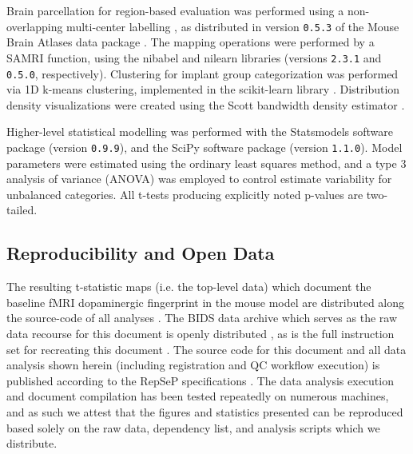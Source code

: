 Brain parcellation for region-based evaluation was performed using a non-overlapping multi-center labelling \cite{dsu1,dsu2,dsu3,dsu4}, as distributed in version \textcolor{mg}{\texttt{0.5.3}} of the Mouse Brain Atlases data package \cite{atlases_generator}.
The mapping operations were performed by a SAMRI function, using the nibabel \cite{nibabel} and nilearn \cite{nilearn} libraries (versions \textcolor{mg}{\texttt{2.3.1}} and \textcolor{mg}{\texttt{0.5.0}}, respectively).
Clustering for implant group categorization was performed via 1D k-means clustering, implemented in the scikit-learn library \cite{scikit-learn}.
Distribution density visualizations were created using the Scott bandwidth density estimator \cite{Scott1979}.

Higher-level statistical modelling was performed with the Statsmodels software package \cite{statsmodels} (version \textcolor{mg}{\texttt{0.9.9}}), and the SciPy software package \cite{scipy} (version \textcolor{mg}{\texttt{1.1.0}}).
Model parameters were estimated using the ordinary least squares method, and a type 3 analysis of variance (ANOVA) was employed to control estimate variability for unbalanced categories.
All t-tests producing explicitly noted p-values are two-tailed.

\subsection{Reproducibility and Open Data}

The resulting t-statistic maps (i.e. the top-level data) which document the baseline fMRI dopaminergic fingerprint in the mouse model are distributed along the source-code of all analyses \cite{me}.
The BIDS \cite{bids} data archive which serves as the raw data recourse for this document is openly distributed \cite{opfvta_bidsdata}, as is the full instruction set for recreating this document \cite{me}.
The source code for this document and all data analysis shown herein (including registration and QC workflow execution) is published according to the RepSeP specifications \cite{repsep}.
The data analysis execution and document compilation has been tested repeatedly on numerous machines, and as such we attest that the figures and statistics presented can be reproduced based solely on the raw data, dependency list, and analysis scripts which we distribute.
